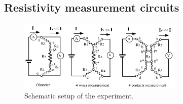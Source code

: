 \subsection{Resistivity measurement circuits}
\label{sec:R-measurement}

\begin{figure}
    \centering
    \includegraphics[width=0.7\textwidth]{graphics/r-measure.png}
    \caption[width=0.7\textwidth]{Schematic setup of the experiment\cite{instruction}.}
    \label{fig:setup}
  \end{figure}